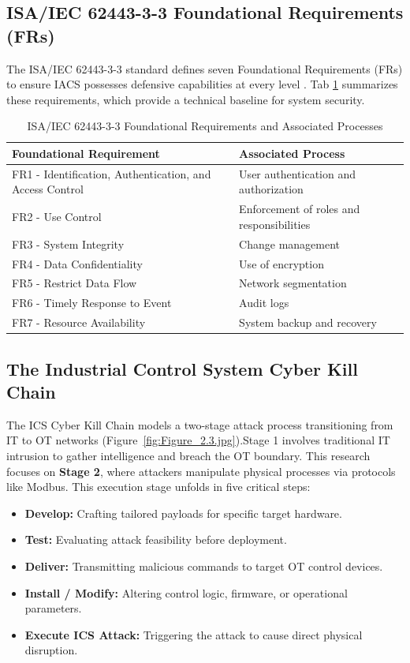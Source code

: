 \subsection{ISA/IEC 62443-3-3 Foundational Requirements (FRs)}
The ISA/IEC 62443-3-3 standard defines seven Foundational Requirements (FRs) to ensure IACS possesses defensive capabilities at every level \cite{ref_report15}. Tab \ref{tab:iec62443_fr} summarizes these requirements, which provide a technical baseline for system security.
\\[0.1cm]
\begin{table}[htbp]
\caption{ISA/IEC 62443-3-3 Foundational Requirements and Associated Processes}
\centering
\begin{tabular}{|p{7.5cm}|p{7.5cm}|}
\hline
\textbf{Foundational Requirement} & \textbf{Associated Process} \\ \hline
FR1 - Identification, Authentication, and Access Control & User authentication and authorization \\ \hline
FR2 - Use Control & Enforcement of roles and responsibilities \\ \hline
FR3 - System Integrity & Change management \\ \hline
FR4 - Data Confidentiality & Use of encryption \\ \hline
FR5 - Restrict Data Flow & Network segmentation \\ \hline
FR6 - Timely Response to Event & Audit logs \\ \hline
FR7 - Resource Availability & System backup and recovery \\ \hline
\end{tabular}
\label{tab:iec62443_fr}
\end{table}

\newpage

\subsection{The Industrial Control System Cyber Kill Chain}
The ICS Cyber Kill Chain \cite{ref_report16} models a two-stage attack process transitioning from IT to OT networks (Figure~\ref{fig:Figure_2.3.jpg}).Stage 1 involves traditional IT intrusion to gather intelligence and breach the OT boundary.
This research focuses on \textbf{Stage 2}, where attackers manipulate physical processes via protocols like Modbus. This execution stage unfolds in five critical steps:

\begin{itemize}
    \item \textbf{Develop:} Crafting tailored payloads for specific target hardware.
    \item \textbf{Test:} Evaluating attack feasibility before deployment.
    \item \textbf{Deliver:} Transmitting malicious commands to target OT control devices.
    \item \textbf{Install / Modify:} Altering control logic, firmware, or operational parameters.
    \item \textbf{Execute ICS Attack:} Triggering the attack to cause direct physical disruption.
\end{itemize}

